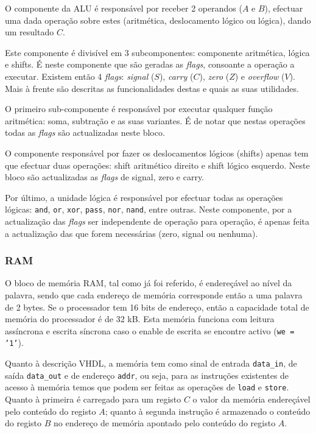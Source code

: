 \documentclass[a4paper]{article}
\begin{document}
				O componente da ALU é responsável por receber 2 operandos ($A$ e $B$), efectuar uma dada operação sobre estes (aritmética, deslocamento lógico ou lógica), dando um resultado $C$.
				
				Este componente é divisível em 3 subcomponentes: componente aritmética, lógica e shifts. É neste componente que são geradas as \textit{flags}, consoante a operação a executar. Existem então 4 \textit{flags}: \textit{signal} ($S$), \textit{carry} ($C$), \textit{zero} ($Z$) e \textit{overflow} ($V$). Mais à frente são descritas as funcionalidades destas e quais as suas utilidades.
				
				O primeiro sub-componente é responsável por executar qualquer função aritmética: soma, subtração e as suas variantes. É de notar que nestas operações todas as \textit{flags} são actualizadas neste bloco.
				
				O componente responsável por fazer os deslocamentos lógicos (shifts) apenas tem que efectuar duas operações: shift aritmético direito e shift lógico esquerdo. Neste bloco são actualizadas as \textit{flags} de signal, zero e carry.
				
				Por último, a unidade lógica é responsável por efectuar todas as operações lógicas: \texttt{and}, \texttt{or}, \texttt{xor}, \texttt{pass}, \texttt{nor}, \texttt{nand}, entre outras. Neste componente, por a actualização das \textit{flags} ser independente de operação para operação, é apenas feita a actualização das que forem necessárias (zero, signal ou nenhuma).
			
			\subsubsection{RAM}
				
				O bloco de memória RAM, tal como já foi referido, é endereçável ao nível da palavra, sendo que cada endereço de memória corresponde então a uma palavra de 2 bytes. Se o processador tem 16 bits de endereço, então a capacidade total de memória do processador é de 32 kB. Esta memória funciona com leitura assíncrona e escrita síncrona caso o enable de escrita se encontre activo (\texttt{we = '1'}).
				
				Quanto à descrição VHDL, a memória tem como sinal de entrada \texttt{data\_in}, de saída \texttt{data\_out} e de endereço \texttt{addr}, ou seja, para as instruções existentes de acesso à memória temos que podem ser feitas as operações de \texttt{load} e \texttt{store}. Quanto à primeira é carregado para um registo $C$ o valor da memória endereçável pelo conteúdo do registo $A$; quanto à segunda instrução é armazenado o conteúdo do registo $B$ no endereço de memória apontado pelo conteúdo do registo $A$.
				
\end{document}
